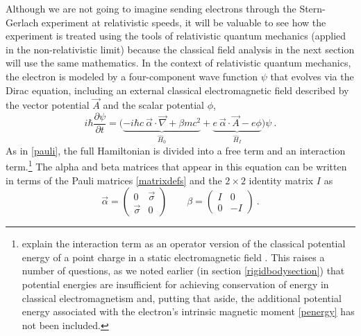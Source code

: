\documentclass[12pt,secnumarabic,amsmath,amssymb,balancelastpage,nofootinbib]{article}
\begin{document}
Although we are not going to imagine sending electrons through the Stern-Gerlach experiment at relativistic speeds, it will be valuable to see how the experiment is treated using the tools of relativistic quantum mechanics (applied in the non-relativistic limit) because the classical field analysis in the next section will use the same mathematics.  In the context of relativistic quantum mechanics, the electron is modeled by a four-component wave function $\psi$ that evolves via the Dirac equation, including an external classical electromagnetic field described by the vector potential $\vec{A}$ and the scalar potential $\phi$,
\begin{equation}
i \hbar \frac{\partial \psi}{\partial t}=\big(\underbrace{-i \hbar c \: \vec{\alpha}\cdot\vec{\nabla} + \beta m c^2}_{\widehat{H}_0} + \underbrace{e\: \vec{\alpha} \cdot \vec{A} - e \phi}_{\widehat{H}_I} \big)\psi
\ .
\label{dirac}
\end{equation}
As in \eqref{pauli}, the full Hamiltonian is divided into a free term and an interaction term.\footnote{\citet[pg.\ 11]{bjorkendrell} explain the interaction term as an operator version of the classical potential energy of a point charge in a static electromagnetic field \citep[sec.\ 15.6]{feynman2}.  This raises a number of questions, as we noted earlier (in section \ref{rigidbodysection}) that potential energies are insufficient for achieving conservation of energy in classical electromagnetism and, putting that aside, the additional potential energy associated with the electron's intrinsic magnetic moment \eqref{penergy} has not been included.}  The alpha and beta matrices that appear in this equation can be written in terms of the Pauli matrices \eqref{matrixdefs} and the $2 \times 2$ identity matrix $I$ as
\begin{equation}
\vec{\alpha}=\left(\begin{matrix} 0&\vec{\sigma}\\ \vec{\sigma}&0 \end{matrix}\right) \quad\quad \beta = \left(\begin{matrix} I&0\\ 0&-I \end{matrix}\right)
\ .
\label{matrixdefs2}
\end{equation}
\end{document}
